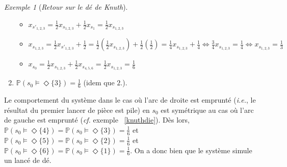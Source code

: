 \documentclass[12pt,a4paper]{report}
\theoremstyle{definition}
\theoremstyle{remark}
\newtheorem{example}{Exemple}[chapter]
\newcommand{\ie}{\textit{i.e.}, }
\newcommand{\cf}{\textit{cf.} }
\begin{document}
\begin{example}[\textit{Retour sur le dé de Knuth}]
\begin{spacing}{1.5}
\begin{enumerate}
\begin{itemize}
			\item $x_{s'_{1, 2, 3}} = \frac{1}{2} x_{s_{1, 2, 3}} + \frac{1}{2} x_{s_1} = \frac{1}{2} x_{s_{1, 2, 3}}$
			\item $x_{s_{1, 2, 3}} = \frac{1}{2} x_{s'_{1, 2, 3}} + \frac{1}{2}  = 
			\frac{1}{2} (\frac{1}{2} x_{s_{1, 2, 3}}) +\frac{1}{2} (\frac{1}{2})
			= \frac{1}{4} x_{s_{1, 2, 3}} +\frac{1}{4}
			\Leftrightarrow \frac{3}{4} x_{s_{1, 2, 3}} = \frac{1}{4}
			\Leftrightarrow x_{s_{1, 2, 3}} = \frac{1}{3}$
			\item $x_{s_0} = \frac{1}{2} x_{s_{1,2,3}} + \frac{1}{2} x_{s_{4, 5, 6}} = \frac{1}{2} x_{s_{1,2,3}} = \frac{1}{6}$
		\end{itemize}
		\item $\mathbb{P}(s_0 \models \Diamond \{3\}) = \frac{1}{6}$ (idem que $2.$).
	\end{enumerate}\end{spacing}
	Le comportement du système dans le cas où l'arc de droite est emprunté (\ie le résultat du premier lancer de pièce est pile) en $s_0$ est symétrique au cas où l'arc de gauche est emprunté (\cf exemple  ~\ref{knuthdie}). Dès lors, $\mathbb{P}(s_0 \models \Diamond \{4\}) = \mathbb{P}(s_0 \models \Diamond \{3\}) = \frac{1}{6}$ et $\mathbb{P}(s_0 \models \Diamond \{5\}) = \mathbb{P}(s_0 \models \Diamond \{2\}) = \frac{1}{6}$ et $\mathbb{P}(s_0 \models \Diamond \{6\}) = \mathbb{P}(s_0 \models \Diamond \{1\}) = \frac{1}{6}$. On a donc bien que le système simule un lancé de dé.
	
\end{example}
\end{document}
